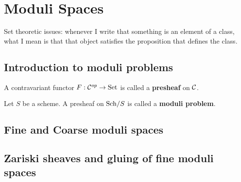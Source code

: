\chapter{Moduli Spaces}
Set theoretic issues: whenever I write that something is an element of a class, what I mean is that that object satisfies the proposition that defines the class.

\section{Introduction to moduli problems}
\begin{definition}[Presheaf]
A contravariant functor $F:\mathcal{C}^{op}\to \mathrm{Set}$ is called a \textbf{presheaf} on $\mathcal{C}$.
\end{definition}

\begin{definition}
Let $S$ be a scheme. A presheaf on ${\mathrm{Sch}}/{S}$ is called a \textbf{moduli problem}.
\end{definition}

\section{Fine and Coarse moduli spaces}

\section{Zariski sheaves and gluing of fine moduli spaces}

